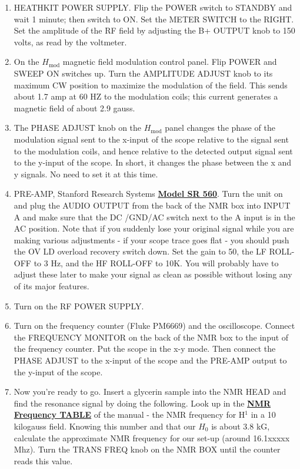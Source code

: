 \documentclass{../lab}
\begin{document}
\begin{enumerate}
    \item HEATHKIT POWER SUPPLY. Flip the POWER switch to STANDBY and wait 1 minute; then switch to ON. Set the METER SWITCH to the RIGHT. Set the amplitude of the RF field by adjusting the B+ OUTPUT knob to 150 volts, as read by the voltmeter.

    \item On the $H_\text{mod}$ magnetic field modulation control panel. Flip POWER and SWEEP ON switches up. Turn the AMPLITUDE ADJUST knob to its maximum CW position to maximize the modulation of the field. This sends about 1.7 amp at 60 HZ to the modulation coils; this current generates a magnetic field of about 2.9 gauss.

    \item The PHASE ADJUST knob on the $H_\text{mod}$ panel changes the phase of the modulation signal sent to the x-input of the scope relative to the signal sent to the modulation coils, and hence relative to the detected output signal sent to the y-input of the scope. In short, it changes the phase between the x and y signals. No need to set it at this time.

    \item PRE-AMP, Stanford Research Systems \href{http://physics111.lib.berkeley.edu/Physics111/Equipment_Manuals/JOS/OCR\%20SR560\%20low\%20noise\%20preamp.pdf}{\textbf{Model SR 560}}. Turn the unit on and plug the AUDIO OUTPUT from the back of the NMR box into INPUT A and make sure that the DC /GND/AC switch next to the A input is in the AC position. Note that if you suddenly lose your original signal while you are making various adjustments - if your scope trace goes flat - you should push the OV LD overload recovery switch down. Set the gain to 50, the LF ROLL-OFF to 3 Hz, and the HF ROLL-OFF to 10K. You will probably have to adjust these later to make your signal as clean as possible without losing any of its major features.

    \item Turn on the RF POWER SUPPLY.

    \item Turn on the frequency counter (Fluke PM6669) and the oscilloscope. Connect the FREQUENCY MONITOR on the back of the NMR box to the input of the frequency counter. Put the scope in the x-y mode. Then connect the PHASE ADJUST to the x-input of the scope and the PRE-AMP output to the y-input of the scope.

    \item Now you're ready to go. Insert a glycerin sample into the NMR HEAD and find the resonance signal by doing the following. Look up in the \href{http://experimentationlab.berkeley.edu/sites/default/files/images/NMR32.jpg}{\textbf{NMR Frequency TABLE}} of the manual - the NMR frequency for H$^1$ in a 10 kilogauss field. Knowing this number and that our $H_0$ is about 3.8 kG, calculate the approximate NMR frequency for our set-up (around 16.1xxxxx Mhz). Turn the TRANS FREQ knob on the NMR BOX until the counter reads this value.
    

\end{enumerate}
\end{document}
